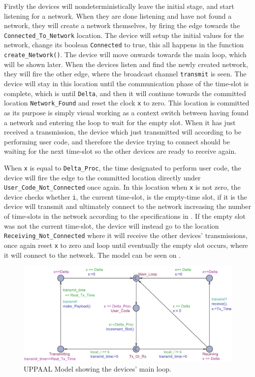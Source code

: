 Firstly the devices will nondeterministically leave the initial stage, and start listening for a network.
When they are done listening and have not found a network, they will create a network themselves, by firing the edge towards the \texttt{Connected\_To\_Network} location.
The device will setup the initial values for the network, change its boolean \texttt{Connected} to true, this all happens in the function \texttt{create\_Network()}. 
The device will move onwards towards the main loop, which will be shown later.
When the devices listen and find the newly created network, they will fire the other edge, where the broadcast channel \texttt{transmit} is seen.
The device will stay in this location until the communication phase of the time-slot is complete, which is until \texttt{Delta}, and then it will continue towards the committed location \texttt{Network\_Found} and reset the clock \texttt{x} to zero.
This location is committed as its purpose is simply visual working as a context switch between having found a network and entering the loop to wait for the empty slot.
When it has just received a transmission, the device which just transmitted will according to  be performing user code, and therefore the device trying to connect should be waiting for the next time-slot so the other devices are ready to receive again.

\bigskip \noindent
When \texttt{x} is equal to \texttt{Delta\_Proc}, the time designated to perform user code, the device will fire the edge to the committed location directly under \texttt{User\_Code\_Not\_Connected} once again.
In this location when \texttt{x} is not zero, the device checks whether \texttt{i}, the current time-slot, is the empty-time slot, if it is the device will transmit and ultimately connect to the network increasing the number of time-slots in the network according to the specifications in .
If the empty slot was not the current time-slot, the device will instead go to the location \texttt{Receiving\_Not\_Connected} where it will receive the other devices' transmissions, once again reset \texttt{x} to zero and loop until eventually the empty slot occurs, where it will connect to the network.
The model can be seen on .

\begin{figure}
  \includegraphics[width=1\textwidth]{Figures/Model/Device_Connected.pdf} 
\caption{UPPAAL Model showing the devices' main loop.}
\label{fig:UPPAAL_Connected}
\end{figure}

